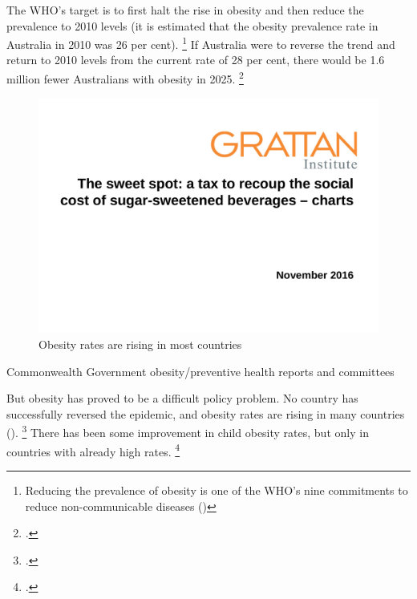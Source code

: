\documentclass[embargoed]{grattan}
\begin{document}
The WHO's target is to first halt the rise in obesity and then reduce the prevalence to 2010 levels (it is estimated that the obesity prevalence rate in Australia in 2010 was 26 per cent).%
\footnote{Reducing the prevalence of obesity is one of the WHO's nine commitments to reduce non-communicable diseases (\textcites{Organization2013GlobalActionPlan}{Organization2016ObesityoverweightFact})} If Australia were to reverse the trend and return to 2010 levels from the current rate of 28 per cent, there would be 1.6 million fewer Australians with obesity in 2025.%
\footcite{Australia2015NoTimeWeight}

\begin{figure}
\caption{Obesity rates are rising in most countries }\label{fig:Obesity-rates-are-rising-in-most-countries}

\includegraphics[page=3]{atlas/ObesityCharts}


\end{figure}

\begin{table}
\caption{Commonwealth Government obesity/preventive health reports and committees}\label{tbl:Health-campaigns}



\end{table}


But obesity has proved to be a difficult policy problem.
No country has successfully reversed the epidemic, and obesity rates are rising in many countries ().%
\footcites{Australia2015NoTimeWeight}{Roberto2015Patchyprogressobesity}{Swinburn2004Dietnutritionprevention} There has been some improvement in child obesity rates, but only in countries with already high rates.%
\footcite{Roberto2015Patchyprogressobesity}
\end{document}

